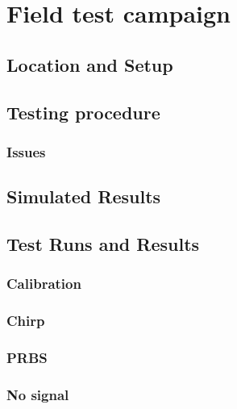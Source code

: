 \chapter{Field test campaign}

\section{Location and Setup}
\section{Testing procedure}
\subsection{Issues}
\section{Simulated Results}
\section{Test Runs and Results}
\subsection{Calibration}
\subsection{Chirp}
\subsection{PRBS}
\subsection{No signal}